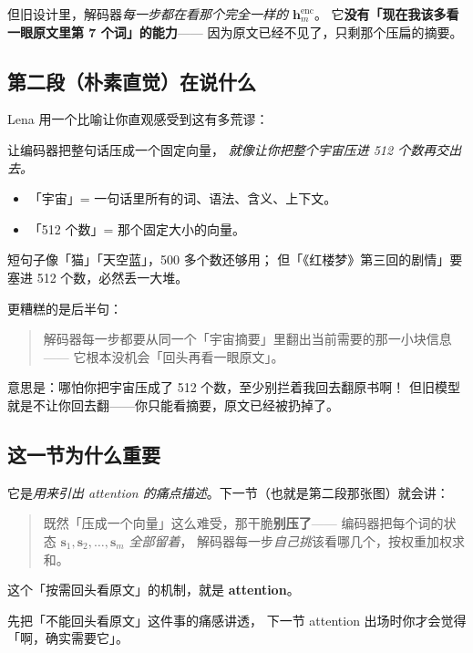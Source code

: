 \documentclass[11pt,a4paper]{ctexart}
\newcommand{\vect}[1]{\boldsymbol{#1}}
\begin{document}
但旧设计里，解码器\emph{每一步都在看那个完全一样的 $\vect{h}^{\text{enc}}_m$}。
它\textbf{没有「现在我该多看一眼原文里第 7 个词」的能力}——
因为原文已经不见了，只剩那个压扁的摘要。

\subsection{第二段（朴素直觉）在说什么}

Lena 用一个比喻让你直观感受到这有多荒谬：

\begin{intuitionblock}
让编码器把整句话压成一个固定向量，
\emph{就像让你把整个宇宙压进 512 个数再交出去。}
\end{intuitionblock}

\begin{itemize}
  \item 「宇宙」= 一句话里所有的词、语法、含义、上下文。
  \item 「512 个数」= 那个固定大小的向量。
\end{itemize}

短句子像「猫」「天空蓝」，500 多个数还够用；
但「《红楼梦》第三回的剧情」要塞进 512 个数，必然丢一大堆。

更糟糕的是后半句：

\begin{quote}
解码器每一步都要从同一个「宇宙摘要」里翻出当前需要的那一小块信息——
它根本没机会「回头再看一眼原文」。
\end{quote}

意思是：哪怕你把宇宙压成了 512 个数，至少别拦着我回去翻原书啊！
但旧模型就是不让你回去翻——你只能看摘要，原文已经被扔掉了。

\subsection{这一节为什么重要}

它是\emph{用来引出 attention 的痛点描述}。下一节（也就是第二段那张图）就会讲：

\begin{quote}
既然「压成一个向量」这么难受，那干脆\textbf{别压了}——
编码器把每个词的状态 $\vect{s}_1, \vect{s}_2, \dots, \vect{s}_m$ \emph{全部留着}，
解码器每一步\emph{自己挑}该看哪几个，按权重加权求和。
\end{quote}

这个「按需回头看原文」的机制，就是 \textbf{attention}。

\begin{keypointblock}
先把「不能回头看原文」这件事的痛感讲透，
下一节 attention 出场时你才会觉得「啊，确实需要它」。
\end{keypointblock}
\end{document}
